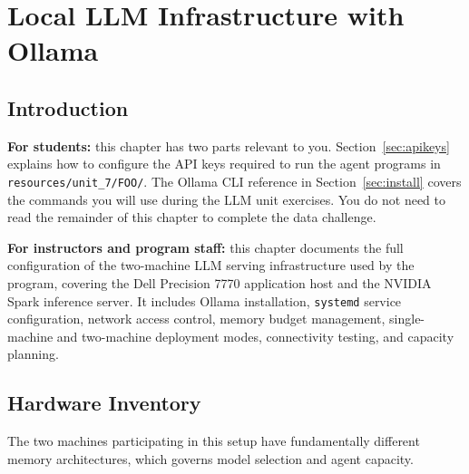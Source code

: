 %

\chapter{Local LLM Infrastructure with Ollama}
\label{ch:ollama-infrastructure}

\section{Introduction}

\vs
\noindent
\textbf{For students:} this chapter has two parts relevant to you.
Section~\ref{sec:apikeys} explains how to configure the API keys
required to run the agent programs in
\texttt{resources/unit\_7/FOO/}. The Ollama CLI reference in
Section~\ref{sec:install} covers the commands you will use during
the LLM unit exercises. You do not need to read the remainder of
this chapter to complete the data challenge.
\vs

\vs
\noindent
\textbf{For instructors and program staff:} this chapter documents
the full configuration of the two-machine LLM serving infrastructure
used by the \ProjectName{} program, covering the Dell
Precision 7770 application host and the NVIDIA Spark inference
server. It includes Ollama installation, \texttt{systemd} service
configuration, network access control, memory budget management,
single-machine and two-machine deployment modes, connectivity
testing, and capacity planning.
\vs

\section{Hardware Inventory}
\label{sec:hardware}

The two machines participating in this setup have fundamentally different
memory architectures, which governs model selection and agent capacity.


